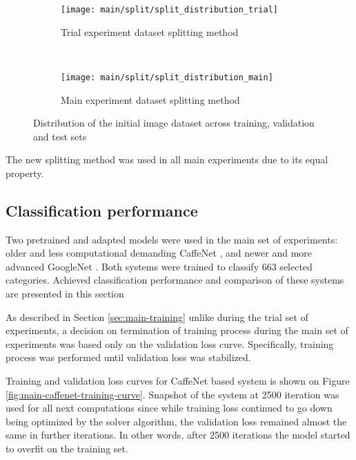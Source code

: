     \begin{figure}[H]
    \centering
    \begin{subfigure}[a]{0.9\textwidth}
        \texttt{[image: main/split/split\_distribution\_trial]}
        \caption{Trial experiment dataset splitting method}
        \label{fig:main-split-distribution-trial}
    \end{subfigure}
    \\
    \begin{subfigure}[a]{0.9\textwidth}
        \texttt{[image: main/split/split\_distribution\_main]}
        \caption{Main experiment dataset splitting method}
        \label{fig:main-split-distribution-main}
    \end{subfigure}
    \caption{Distribution of the initial image dataset across training, validation and test sets}
    \label{fig:main-split-distribution}
    \end{figure}
    
    The new splitting method was used in all main experiments due to its equal property.
    
\subsection{Classification performance}
    Two pretrained and adapted models were used in the main set of experiments: older and less computational demanding CaffeNet \cite{CaffeNet}, and newer and more advanced GoogleNet \cite{Szegedy2015GoingDeeper}. Both systems were trained to classify 663 selected categories. Achieved classification performance and comparison of these systems are presented in this section
    
    As described in Section \ref{sec:main-training} unlike during the trial set of experiments, a decision on termination of training process during the main set of experiments was based only on the validation loss curve. Specifically, training process was performed until validation loss was stabilized.
    
    Training and validation loss curves for CaffeNet based system is shown on Figure \ref{fig:main-caffenet-training-curve}. Snapshot of the system at 2500 iteration was used for all next computations since while training loss continued to go down being optimized by the solver algorithm, the validation loss remained almost the same in further iterations. In other words, after 2500 iterations the model started to overfit on the training set.
    
